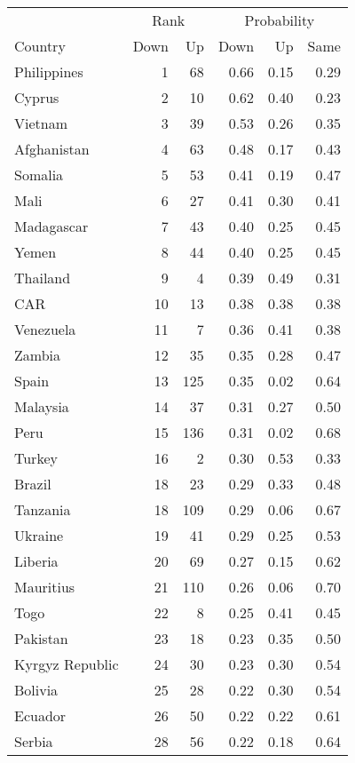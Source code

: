 
\begin{longtable}[t]{lrrrrr}
\toprule
\multicolumn{1}{c}{ } & \multicolumn{2}{c}{Rank} & \multicolumn{3}{c}{Probability} \\
\cmidrule(l{3pt}r{3pt}){2-3} \cmidrule(l{3pt}r{3pt}){4-6}
Country & Down & Up & Down & Up & Same\\
\midrule
Philippines & 1 & 68 & 0.66 & 0.15 & 0.29\\
Cyprus & 2 & 10 & 0.62 & 0.40 & 0.23\\
Vietnam & 3 & 39 & 0.53 & 0.26 & 0.35\\
Afghanistan & 4 & 63 & 0.48 & 0.17 & 0.43\\
Somalia & 5 & 53 & 0.41 & 0.19 & 0.47\\
\addlinespace
Mali & 6 & 27 & 0.41 & 0.30 & 0.41\\
Madagascar & 7 & 43 & 0.40 & 0.25 & 0.45\\
Yemen & 8 & 44 & 0.40 & 0.25 & 0.45\\
Thailand & 9 & 4 & 0.39 & 0.49 & 0.31\\
CAR & 10 & 13 & 0.38 & 0.38 & 0.38\\
\addlinespace
Venezuela & 11 & 7 & 0.36 & 0.41 & 0.38\\
Zambia & 12 & 35 & 0.35 & 0.28 & 0.47\\
Spain & 13 & 125 & 0.35 & 0.02 & 0.64\\
Malaysia & 14 & 37 & 0.31 & 0.27 & 0.50\\
Peru & 15 & 136 & 0.31 & 0.02 & 0.68\\
\addlinespace
Turkey & 16 & 2 & 0.30 & 0.53 & 0.33\\
Brazil & 18 & 23 & 0.29 & 0.33 & 0.48\\
Tanzania & 18 & 109 & 0.29 & 0.06 & 0.67\\
Ukraine & 19 & 41 & 0.29 & 0.25 & 0.53\\
Liberia & 20 & 69 & 0.27 & 0.15 & 0.62\\
\addlinespace
Mauritius & 21 & 110 & 0.26 & 0.06 & 0.70\\
Togo & 22 & 8 & 0.25 & 0.41 & 0.45\\
Pakistan & 23 & 18 & 0.23 & 0.35 & 0.50\\
Kyrgyz Republic & 24 & 30 & 0.23 & 0.30 & 0.54\\
Bolivia & 25 & 28 & 0.22 & 0.30 & 0.54\\
\addlinespace
Ecuador & 26 & 50 & 0.22 & 0.22 & 0.61\\
Serbia & 28 & 56 & 0.22 & 0.18 & 0.64\\

\end{longtable}
